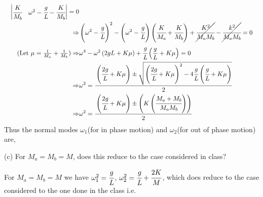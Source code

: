 \documentclass[addpoints]{exam}
\begin{document}
\begin{questions}
\begin{solution}
\begin{align*}
\begin{vmatrix}
            \cfrac{K}{M_{b}} & \omega ^{2} -\cfrac{g}{L} -\cfrac{K}{M_{b}} 
        \end{vmatrix} = 0\\ 
        \Rightarrow& \left(\omega^2-\cfrac{g}{L}\right)^2-\left(\omega^2-\cfrac{g}{L}\right)\left(\cfrac{K}{M_a}+\cfrac{K}{M_b}\right) +\cancel{\cfrac{K^2}{M_aM_b}}- \cancel{\cfrac{k^2}{M_aM_b}} = 0 \\ 
        \tag{Let $\mu = \frac{1}{M_a}+\frac{1}{M_b}$}
        \Rightarrow& \omega^4 - \omega^2\left({2g}{L}+K\mu\right)+\cfrac{g}{L}\left(\frac{g}{L}+K\mu\right) =0 \\ 
        \Rightarrow& \omega^2 = \cfrac{\left(\cfrac{2g}{L}+K\mu\right)\pm \sqrt{\left(\cfrac{2g}{L}+K\mu\right)^2 - 4\cfrac{g}{L}\left(\cfrac{g}{L}+K\mu\right) }}{2}\\ 
        \Rightarrow& \omega^2 = \cfrac{\left(\cfrac{2g}{L}+K\mu\right)\pm \left(K\left(\cfrac{M_a+M_b}{M_aM_b}\right)\right)}{2}\\ 
   \end{align*}
   Thus the normal modes $\omega_1$(for in phase motion) and $\omega_2$(for out of phase motion) are,\\
   \begin{center}
   \end{center}
   \end{solution}
(c) For $M_a=M_b=M$, does this reduce to the case considered in class?
\begin{solution}
    For $M_a=M_b=M$ we have $\omega_1^2 = \cfrac{g}{L}$, $\omega_2^2 = \cfrac{g}{L} + \cfrac{2K}{M}$, which does reduce to the case considered to the one done in the class i.e. 
    

\end{solution}
\end{questions}
\end{document}

